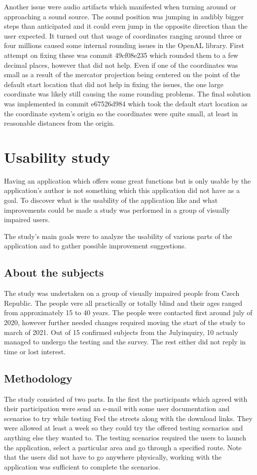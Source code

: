 \documentclass[nolof,digital]{fithesis3}
\begin{document}
Another issue were audio artifacts which manifested when turning around or approaching a sound source. The sound position was jumping in audibly bigger steps than anticipated and it could even jump in the opposite direction than the user expected. It turned out that usage of coordinates ranging around three or four millions caused some internal rounding issues in the OpenAL library. First attempt on fixing these was commit 49cf08e235 which rounded them to a few decimal places, however that did not help. Even if one of the coordinates was small as a result of the mercator projection being centered on the point of the default start location that did not help in fixing the issues, the one large coordinate was likely still causing the same rounding problems. The final solution was implemented in commit e67526d984 which took the default start location as the coordinate system's origin so the coordinates were quite small, at least in reasonable distances from the origin.
\chapter{Usability study}
Having an application which offers some great functions but is only usable by the application's author is not something which this application did not have as a goal. To discover what is the usability of the application like and what improvements could be made a study was performed in a group of visually impaired users.

The study's main goals were to analyze the usability of various parts of the application and to gather possible improvement suggestions.
\section{About the subjects}
The study was undertaken on a group of visually impaired people from Czech Republic. The people vere all practically or totally blind and their ages ranged from approximately 15 to 40 years. The people were contacted first around july of 2020, however further needed changes required moving the start of the study to march of 2021. Out of 15 confirmed subjects from the Julyinquiry, 10 actualy managed to undergo the testing and the survey. The rest either did not reply in time or lost interest.
\section{Methodology}
The study consisted of two parts. In the first the participants which agreed with their participation were send an e-mail with some user documentation and scenarios to try while testing Feel the streets along with the download links. They were allowed at least a week so they could try the offered testing scenarios and anything else they wanted to. The testing scenarios required the users to launch the application, select a particular area and go through a specified route. Note that the users did not have to go anywhere physically, working with the application was sufficient to complete the scenarios.
\end{document}
